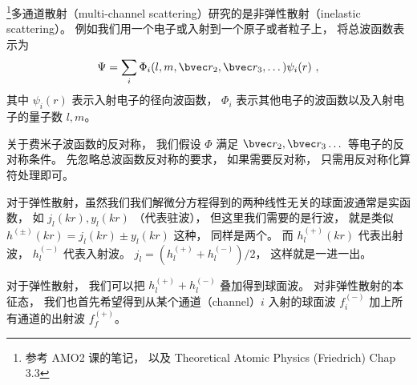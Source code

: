 
\begin{issues}
\issueDraft
\end{issues}

\footnote{参考 AMO2 课的笔记， 以及 Theoretical Atomic Physics (Friedrich) Chap 3.3}多通道散射（multi-channel scattering）研究的是非弹性散射（inelastic scattering）。 例如我们用一个电子或入射到一个原子或者粒子上， 将总波函数表示为
\begin{equation}
\Psi = \sum_i \Phi_i (l, m, \bvec r_2, \bvec r_3, \dots) \psi_i (r)~,
\end{equation}
其中 $\psi_i(r)$ 表示入射电子的径向波函数， $\Phi_i$ 表示其他电子的波函数以及入射电子的量子数 $l, m$。

关于费米子波函数的反对称， 我们假设 $\Phi$ 满足 $\bvec r_2, \bvec r_3 \dots$ 等电子的反对称条件。 先忽略总波函数反对称的要求， 如果需要反对称， 只需用反对称化算符处理即可。

对于弹性散射，虽然我们我们解微分方程得到的两种线性无关的球面波通常是实函数， 如 $j_l(kr), y_l(kr)$ （代表驻波）， 但这里我们需要的是行波， 就是类似 $h^{(\pm)}(kr) = j_l(kr) \pm y_l(kr)$ 这种， 同样是两个。 而 $h_l^{(+)}(kr)$ 代表出射波， $h_l^{(-)}$ 代表入射波。 $j_l = (h_l^{(+)} + h_l^{(-)})/2$， 这样就是一进一出。

对于弹性散射， 我们可以把 $h_l^{(+)} + h_l^{(-)}$ 叠加得到球面波。 对非弹性散射的本征态， 我们也首先希望得到从某个通道（channel）$i$ 入射的球面波 $f_i^{(-)}$ 加上所有通道的出射波 $f_f^{(+)}$。
